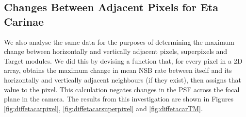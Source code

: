 \subsection{Changes Between Adjacent Pixels for Eta Carinae}
\label{sec:etacarajacent}

We also analyse the same data for the purposes of determining the maximum change between horizontally and vertically adjacent pixels, superpixels and Target modules.
We did this by devising a function that, for every pixel in a 2D array, obtains the maximum change in mean NSB rate between itself and its horizontally and vertically adjacent neighbours (if they exist), then assigns that value to the pixel. This calculation negates changes in the PSF across the focal plane in the camera. The results from this investigation are shown in Figures \ref{fig:diffetacarpixel}, \ref{fig:diffetacarsuperpixel} and \ref{fig:diffetacarTM}.



